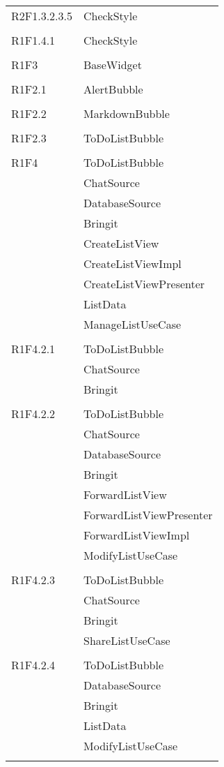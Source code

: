 \begin{center}
\begin{longtable}{|p{7cm}|p{7cm}|}
		R2F1.3.2.3.5 & CheckStyle \\ & \\ \hline
		R1F1.4.1 & CheckStyle \\ & \\ \hline
		R1F3 & BaseWidget \\ & \\ \hline
		R1F2.1 & AlertBubble \\ & \\ \hline
		R1F2.2 & MarkdownBubble \\ & \\ \hline
		R1F2.3 & ToDoListBubble \\ & \\ \hline
		R1F4 & ToDoListBubble \\ & ChatSource \\ & DatabaseSource \\ & Bringit \\ & CreateListView \\ & CreateListViewImpl \\ & CreateListViewPresenter \\ & ListData \\ & ManageListUseCase \\ & \\ \hline
		R1F4.2.1 & ToDoListBubble \\ & ChatSource \\ & Bringit \\ & \\ \hline
		R1F4.2.2 & ToDoListBubble \\ & ChatSource \\ & DatabaseSource \\ & Bringit \\ & ForwardListView \\ & ForwardListViewPresenter \\ & ForwardListViewImpl \\ & ModifyListUseCase \\ & \\ \hline
		R1F4.2.3 & ToDoListBubble \\ & ChatSource \\ & Bringit \\ & ShareListUseCase \\ & \\ \hline
		R1F4.2.4 & ToDoListBubble \\ & DatabaseSource \\ & Bringit \\ & ListData \\ & ModifyListUseCase \\ & \\ \hline

\end{longtable}
\end{center}
